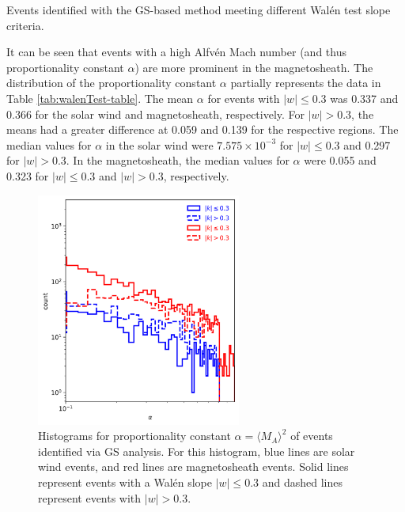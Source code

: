 \begin{table}
    \caption{Events identified with the GS-based method meeting different Wal\'en test slope criteria.}
    \centering
    
    \label{tab:walenTest-table}
\end{table}

It can be seen that events with a high Alfv\'en Mach number (and thus proportionality constant $\alpha$) are more prominent in the magnetosheath. The distribution of the proportionality constant $\alpha$ partially represents the data in Table \ref{tab:walenTest-table}. The mean $\alpha$ for events with $|w|\leq 0.3$ was 0.337 and 0.366 for the solar wind and magnetosheath, respectively. For $|w|>0.3$, the means had a greater difference at 0.059 and 0.139 for the respective regions. The median values for $\alpha$ in the solar wind were $7.575\times 10^{-3}$ for $|w|\leq 0.3$ and 0.297 for $|w|>0.3$. In the magnetosheath, the median values for $\alpha$ were 0.055 and 0.323 for $|w|\leq 0.3$ and $|w|>0.3$, respectively.

\begin{figure}
    \centering
    \includegraphics[width=0.6\textwidth]{Figures/Histograms/histogram_alpha.png}
    \caption[Histograms for proportionality constant $\alpha = \langle M_A \rangle^2$]{Histograms for proportionality constant $\alpha = \langle M_A \rangle^2$ of events identified via GS analysis. For this histogram, blue lines are solar wind events, and red lines are magnetosheath events. Solid lines represent events with a Wal\'en slope $|w|\leq 0.3$ and dashed lines represent events with $|w|> 0.3$.}
    \label{fig:histogram-alpha}
\end{figure}

